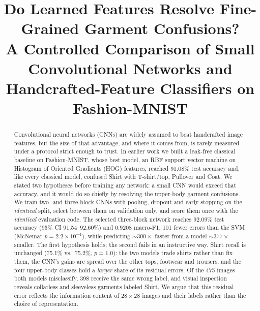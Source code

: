 \documentclass[conference]{IEEEtran}
\begin{document}
\title{Do Learned Features Resolve Fine-Grained Garment Confusions?\\[2pt]
\large A Controlled Comparison of Small Convolutional Networks and\\Handcrafted-Feature Classifiers on Fashion-MNIST}

\author{
}

\maketitle

\begin{abstract}
Convolutional neural networks (CNNs) are widely assumed to beat handcrafted image features, but the size of that
advantage, and where it comes from, is rarely measured under a protocol strict enough to trust. In earlier work we built a
leak-free classical baseline on Fashion-MNIST, whose best model, an RBF support vector machine on Histogram of Oriented
Gradients (HOG) features, reached 91.08\% test accuracy and, like every classical model, confused Shirt with
T-shirt/top, Pullover and Coat. We stated two hypotheses before training any network: a small CNN would exceed that
accuracy, and it would do so chiefly by resolving the upper-body garment confusions. We train two- and three-block CNNs
with pooling, dropout and early stopping on the \emph{identical} split, select between them on validation only, and score
them once with the \emph{identical} evaluation code. The selected three-block network reaches 92.09\% test accuracy
(95\% CI 91.54--92.60\%) and 0.9208 macro-F1, 101 fewer errors than the SVM (McNemar $p=2.2\times10^{-4}$), while
predicting ${\sim}300\times$ faster from a model ${\sim}377\times$ smaller. The first hypothesis holds; the second fails
in an instructive way. Shirt recall is unchanged (75.1\% vs.\ 75.2\%, $p=1.0$): the two models trade shirts rather than
fix them, the CNN's gains are spread over the other tops, footwear and trousers, and the four upper-body classes hold a
\emph{larger} share of its residual errors. Of the 475 images both models misclassify, 398 receive the same wrong label, and visual inspection
reveals collarless and sleeveless garments labeled Shirt. We argue that this residual error reflects the information
content of $28\times28$ images and their labels rather than the choice of representation.
\end{abstract}
\end{document}
